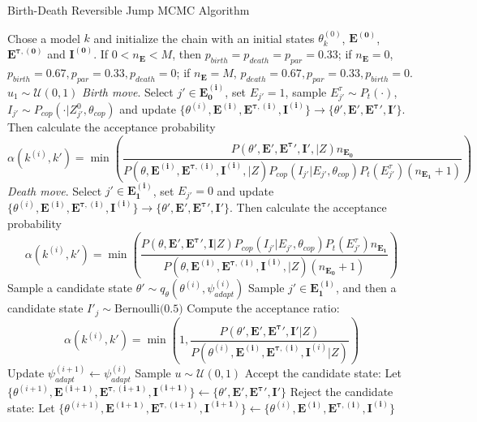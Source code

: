 \documentclass{article}
\begin{document}
\begin{algorithm}[H]
\caption{Birth-Death Reversible Jump MCMC Algorithm}
\label{alg:rjmcmc_B}
\begin{algorithmic}[1]
    \State Chose a model $k$ and initialize the chain with an initial states $\theta^{(0)}_{k}$, $\mathbf{E^{(0)}}$, $\mathbf{E^{\tau, (0)}}$ and $\mathbf{I^{(0)}}$. If $0 < n_\mathbf{E} < M$, then $p_{birth} = p_{death} = p_{par} = 0.33$; if $n_\mathbf{E} = 0$, $p_{birth} = 0.67, p_{par} = 0.33, p_{death} = 0$; if $n_\mathbf{E} = M$, $p_{death} = 0.67, p_{par} = 0.33, p_{birth} = 0$.
    	\State $u_1 \sim \mathcal{U}(0, 1)$  
	 	\State \textit{Birth move}. Select $j' \in \mathbf{E^{(i)}_0}$, set $E_{j'} = 1$, sample $E^\tau_{j'} \sim P_t(\cdot)$, $I_{j'}\sim P_{cop}(\cdot | Z_{j'}^0, \theta_{cop})$ and update $\{\theta^{(i)}, \mathbf{E^{(i)}}, \mathbf{E^{\tau, (i)}}, \mathbf{I^{(i)}}\} \rightarrow \{\theta', \mathbf{E}', \mathbf{E^\tau}', \mathbf{I}'\}$. Then calculate the acceptance probability 
		$$\alpha(k^{(i)}, k') = \min\left(\frac{P(\theta', \mathbf{E}', \mathbf{E^\tau}', \mathbf{I}', | Z)n_{\mathbf{E_0}}}{P(\theta, \mathbf{E^{(i)}}, \mathbf{E^{\tau, (i)}}, \mathbf{I^{(i)}}, | Z)P_{cop}(I_{j'} | E_{j'}, \theta_{cop})P_t(E^\tau_{j'})(n_{\mathbf{E_1}} + 1)} \right)$$
		\State \textit{Death move}. Select $j' \in \mathbf{E^{(i)}_1}$, set $E_{j'} = 0$ and update $\{\theta^{(i)}, \mathbf{E^{(i)}}, \mathbf{E^{\tau, (i)}}, \mathbf{I^{(i)}}\} \rightarrow \{\theta', \mathbf{E}', \mathbf{E^\tau}', \mathbf{I}'\}$. Then calculate the acceptance probability 
$$\alpha(k^{(i)}, k') = \min\left(\frac{P(\theta, \mathbf{E}', \mathbf{E^{\tau}}', \mathbf{I} | Z)P_{cop}(I_{j'} | E_{j'}, \theta_{cop})P_t(E^\tau_{j'})n_{\mathbf{E_1}}}{P(\theta, \mathbf{E^{(i)}}, \mathbf{E^{\tau, (i)}}, \mathbf{I^{(i)}}, | Z)(n_{\mathbf{E_0}} + 1)} \right)$$
	\Else
 	\State Sample a candidate state $\theta' \sim q_\theta(\theta^{(i)}, \psi^{(i)}_{adapt})$
    	\State Sample  $j' \in \mathbf{E^{(i)}_1}$, and then a candidate state $I'_j \sim \text{Bernoulli(0.5)}$
    	    \State Compute the acceptance ratio:
        		\[
        \alpha(k^{(i)}, k') = \min\left(1, \frac{P(\theta', \mathbf{E}', \mathbf{E^{\tau}}', \mathbf{I}'|Z)}{P(\theta^{(i)}, \mathbf{E^{(i)}}, \mathbf{E^{\tau, (i)}}, \mathbf{I}^{(i)}|Z)} \right)
        			\]
	\State Update $ \psi^{(i + 1)}_{adapt} \leftarrow \psi^{(i)}_{adapt}$
        \EndIf 
		   \State Sample $u \sim \mathcal{U}(0, 1)$
            			\State Accept the candidate state: Let $\{\theta^{(i+1)}, \mathbf{E^{(i+1)}}, \mathbf{E^{\tau, (i+1)}}, \mathbf{I^{(i+1)}}\} \leftarrow \{\theta', \mathbf{E}', \mathbf{E^\tau}', \mathbf{I}'\}$
			\Else
				\State Reject the candidate state: Let $\{\theta^{(i+1)}, \mathbf{E^{(i+1)}}, \mathbf{E^{\tau, (i+1)}}, \mathbf{I^{(i+1)}}\} \leftarrow \{\theta^{(i)}, \mathbf{E^{(i)}}, \mathbf{E^{\tau, (i)}}, \mathbf{I^{(i)}}\}$

			\EndIf        

    \EndFor
\end{algorithmic}
\end{algorithm}
\end{document}
